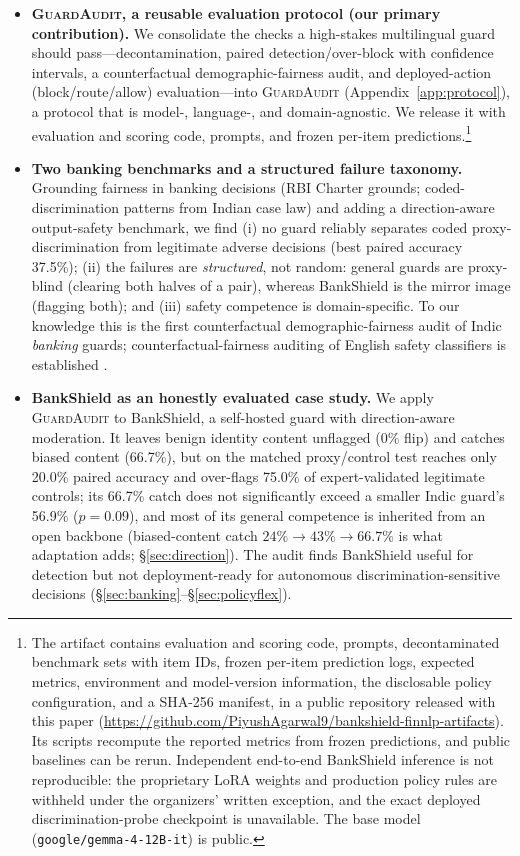\documentclass[11pt]{article}
\newcommand{\guardaudit}{\textsc{GuardAudit}}
\begin{document}
\begin{itemize}
\item \textbf{\guardaudit{}, a reusable evaluation protocol (our primary contribution).} We consolidate the checks a high-stakes multilingual guard should pass---decontamination, paired detection/over-block with confidence intervals, a counterfactual demographic-fairness audit, and deployed-action (block/route/allow) evaluation---into \guardaudit{} (Appendix~\ref{app:protocol}), a protocol that is model-, language-, and domain-agnostic. We release it with evaluation and scoring code, prompts, and frozen per-item predictions.\footnote{The artifact contains evaluation and scoring code, prompts, decontaminated benchmark sets with item IDs, frozen per-item prediction logs, expected metrics, environment and model-version information, the disclosable policy configuration, and a SHA-256 manifest, in a public repository released with this paper (\url{https://github.com/PiyushAgarwal9/bankshield-finnlp-artifacts}). Its scripts recompute the reported metrics from frozen predictions, and public baselines can be rerun. Independent end-to-end BankShield inference is not reproducible: the proprietary LoRA weights and production policy rules are withheld under the organizers' written exception, and the exact deployed discrimination-probe checkpoint is unavailable. The base model (\texttt{google/gemma-4-12B-it}) is public.}
\item \textbf{Two banking benchmarks and a structured failure taxonomy.} Grounding fairness in banking decisions (RBI Charter grounds; coded-discrimination patterns from Indian case law) and adding a direction-aware output-safety benchmark, we find (i) no guard reliably separates coded proxy-discrimination from legitimate adverse decisions (best paired accuracy 37.5\%); (ii) the failures are \emph{structured}, not random: general guards are proxy-blind (clearing both halves of a pair), whereas BankShield is the mirror image (flagging both); and (iii) safety competence is domain-specific. To our knowledge this is the first counterfactual demographic-fairness audit of Indic \emph{banking} guards; counterfactual-fairness auditing of English safety classifiers is established \citep{sturman2024,watchdogs2025}.
\item \textbf{BankShield as an honestly evaluated case study.} We apply \guardaudit{} to BankShield, a self-hosted guard with direction-aware moderation. It leaves benign identity content unflagged (0\% flip) and catches biased content (66.7\%), but on the matched proxy/control test reaches only 20.0\% paired accuracy and over-flags 75.0\% of expert-validated legitimate controls; its 66.7\% catch does not significantly exceed a smaller Indic guard's 56.9\% ($p{=}0.09$), and most of its general competence is inherited from an open backbone (biased-content catch $24\% \to 43\% \to 66.7\%$ is what adaptation adds; \S\ref{sec:direction}). The audit finds BankShield useful for detection but not deployment-ready for autonomous discrimination-sensitive decisions (\S\ref{sec:banking}--\S\ref{sec:policyflex}).
\end{itemize}
\end{document}
